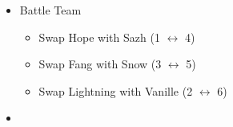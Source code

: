 \begin{paracol}{2}
\begin{menu}
\begin{itemize}
\begin{itemize}
				      {\paradigmline{[\com]}{\sab}{\com}}%
				      {\paradigmline[5]{\textit{[\syn]}}{\textit{\sab}}{\textit{\com}}}%
				      {\paradigmline{[\com]}{(\rav)}{\com}}
			\end{itemize}
		\end{itemize}
	\end{menu}
	\switchcolumn
	\begin{menu}
		\begin{itemize}
			\paradigm
			\begin{itemize}
				\item Battle Team
				      \begin{itemize}
					      \item Swap Hope with Sazh (1 $\leftrightarrow$ 4)
					      \item Swap Fang with Snow (3 $\leftrightarrow$ 5)
					      \item Swap Lightning with Vanille (2 $\leftrightarrow$ 6)
				      \end{itemize}
				\item {}%
				      {\paradigmline{\com}{\med}{(\com)}}%
				      {\paradigmline{\com}{(\sab)}{\rav}}%
				      {\paradigmline{\syn}{\med}{(\com)}}%
				      {\paradigmline{[\com]}{(\sab)}{\com}}%
				      {\paradigmline[5]{\textit{\syn}}{\textit{[\sab]}}{\textit{\com}}}%
				      {\paradigmline{[\com]}{\rav}{\com}}
			\end{itemize}
		\end{itemize}
	\end{menu}


\end{paracol}
